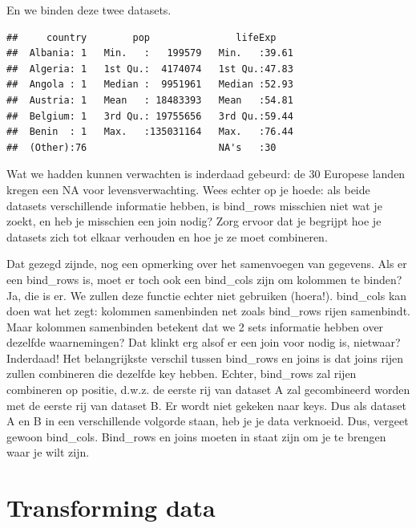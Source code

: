 \documentclass[]{tufte-book}
\newenvironment{Shaded}{}{}
\newcommand{\KeywordTok}[1]{\textcolor[rgb]{0.00,0.44,0.13}{\textbf{#1}}}
\newcommand{\NormalTok}[1]{#1}
\newcommand{\OperatorTok}[1]{\textcolor[rgb]{0.40,0.40,0.40}{#1}}
\newcommand{\StringTok}[1]{\textcolor[rgb]{0.25,0.44,0.63}{#1}}
\begin{document}
En we binden deze twee datasets.

\begin{Shaded}
\end{Shaded}

\begin{verbatim}
##     country        pop               lifeExp     
##  Albania: 1   Min.   :   199579   Min.   :39.61  
##  Algeria: 1   1st Qu.:  4174074   1st Qu.:47.83  
##  Angola : 1   Median :  9951961   Median :52.93  
##  Austria: 1   Mean   : 18483393   Mean   :54.81  
##  Belgium: 1   3rd Qu.: 19755656   3rd Qu.:59.44  
##  Benin  : 1   Max.   :135031164   Max.   :76.44  
##  (Other):76                       NA's   :30
\end{verbatim}

Wat we hadden kunnen verwachten is inderdaad gebeurd: de 30 Europese landen kregen een NA voor levensverwachting. Wees echter op je hoede: als beide datasets verschillende informatie hebben, is bind\_rows misschien niet wat je zoekt, en heb je misschien een join nodig? Zorg ervoor dat je begrijpt hoe je datasets zich tot elkaar verhouden en hoe je ze moet combineren.

Dat gezegd zijnde, nog een opmerking over het samenvoegen van gegevens. Als er een bind\_rows is, moet er toch ook een bind\_cols zijn om kolommen te binden? Ja, die is er. We zullen deze functie echter niet gebruiken (hoera!). bind\_cols kan doen wat het zegt: kolommen samenbinden net zoals bind\_rows rijen samenbindt. Maar kolommen samenbinden betekent dat we 2 sets informatie hebben over dezelfde waarnemingen? Dat klinkt erg alsof er een join voor nodig is, nietwaar? Inderdaad! Het belangrijkste verschil tussen bind\_rows en joins is dat joins rijen zullen combineren die dezelfde key hebben. Echter, bind\_rows zal rijen combineren op positie, d.w.z. de eerste rij van dataset A zal gecombineerd worden met de eerste rij van dataset B. Er wordt niet gekeken naar keys. Dus als dataset A en B in een verschillende volgorde staan, heb je je data verknoeid. Dus, vergeet gewoon bind\_cols. Bind\_rows en joins moeten in staat zijn om je te brengen waar je wilt zijn.

\hypertarget{transforming-data}{%
\section{Transforming data}\label{transforming-data}}
\end{document}
